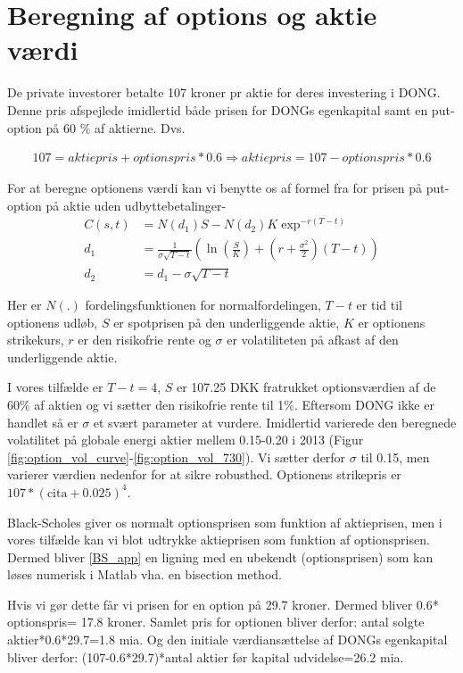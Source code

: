 \documentclass{article}
\begin{document}
\section{Beregning af options og aktie værdi}
\label{sec:app_option}

De private investorer betalte 107 kroner pr aktie for deres investering i DONG. Denne pris afspejlede imidlertid både prisen for DONGs egenkapital samt en put-option på 60 \% af aktierne. Dvs.

\begin{align}
107=aktiepris+optionspris*0.6 \Rightarrow aktiepris= 107-optionspris*0.6
\end{align}

For at beregne optionens værdi kan vi benytte os af formel fra  \cite{Black1973} for prisen på put-option på aktie uden udbyttebetalinger-
\begin{align}
C(s,t)&=N(d_1)S-N(d_2)K \exp^{-r(T-t)} \\
d_1&= \frac{1}{\sigma\sqrt{T-t}}\left( \ln\left( \frac{S}{K} \right)+\left(r+\frac{\sigma^2}{2} \right)(T-t) \right) \nonumber \\
d_2&=d_1-\sigma \sqrt{T-t} \nonumber \label{BS_app}
\end{align}

Her er $N(.)$ fordelingsfunktionen for normalfordelingen, $T-t$ er tid til optionens udløb, $S$ er spotprisen på den underliggende aktie, $K$ er optionens strikekurs, $r$ er den risikofrie rente og $\sigma$ er volatiliteten på afkast af den underliggende aktie. 

I vores tilfælde er $T-t=4$, $S$ er 107.25 DKK fratrukket optionsværdien af de 60\% af aktien og vi sætter den risikofrie rente til 1\%. Eftersom DONG ikke er handlet så er $\sigma$ et svært parameter at vurdere. Imidlertid varierede den  beregnede volatilitet på globale energi aktier mellem 0.15-0.20 i 2013 (Figur \ref{fig:option_vol_curve}-\ref{fig:option_vol_730}). Vi sætter derfor $\sigma$ til 0.15, men varierer værdien nedenfor for at sikre robusthed. Optionens strikepris er $107*(\mathrm{cita}+0.025)^4$.

Black-Scholes giver os normalt optionsprisen som funktion af aktieprisen, men i vores tilfælde kan vi blot udtrykke aktieprisen som funktion af optionsprisen. Dermed bliver \eqref{BS_app} en ligning med en ubekendt (optionsprisen) som kan løses numerisk i Matlab vha. en bisection method.

Hvis vi gør dette får vi prisen for en option på 29.7 kroner. Dermed bliver 0.6* optionspris= 17.8 kroner. 
Samlet pris for optionen bliver derfor: antal solgte aktier*0.6*29.7=1.8 mia.  Og den initiale værdiansættelse af DONGs egenkapital bliver derfor: (107-0.6*29.7)*antal aktier før kapital udvidelse=26.2 mia. 
\end{document}
